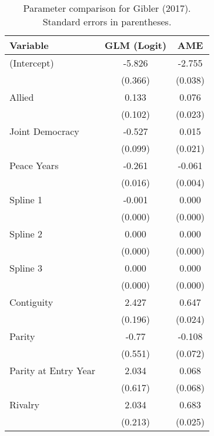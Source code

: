 \begin{table}[ht]
\centering
\begingroup\normalsize
\begin{tabular}{lcc}
 Variable & GLM (Logit) & AME \\ 
  \hline
\hline
(Intercept) & -5.826 & -2.755 \\ 
   & (0.366) & (0.038) \\ 
  Allied & 0.133 & 0.076 \\ 
   & (0.102) & (0.023) \\ 
  Joint Democracy & -0.527 & 0.015 \\ 
   & (0.099) & (0.021) \\ 
  Peace Years & -0.261 & -0.061 \\ 
   & (0.016) & (0.004) \\ 
  Spline 1 & -0.001 & 0.000 \\ 
   & (0.000) & (0.000) \\ 
  Spline 2 & 0.000 & 0.000 \\ 
   & (0.000) & (0.000) \\ 
  Spline 3 & 0.000 & 0.000 \\ 
   & (0.000) & (0.000) \\ 
  Contiguity & 2.427 & 0.647 \\ 
   & (0.196) & (0.024) \\ 
  Parity & -0.77 & -0.108 \\ 
   & (0.551) & (0.072) \\ 
  Parity at Entry Year & 2.034 & 0.068 \\ 
   & (0.617) & (0.068) \\ 
  Rivalry & 2.034 & 0.683 \\ 
   & (0.213) & (0.025) \\ 
   \hline
\hline
\end{tabular}
\endgroup
\caption{Parameter comparison for Gibler (2017). Standard errors in parentheses.} 
\label{tab:appendix_tableB3_coef}
\end{table}
